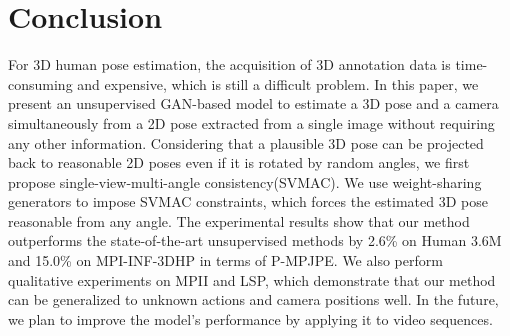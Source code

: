 \documentclass[10pt,twocolumn,letterpaper]{article}
\begin{document}
\section{Conclusion}
For 3D human pose estimation, the acquisition of 3D annotation data is time-consuming and expensive, which is still a difficult problem. 
In this paper, we present an unsupervised GAN-based model to estimate a 3D pose and a camera simultaneously from a 2D pose extracted from a single image without requiring any other information. 
Considering that a plausible 3D pose can be projected back to reasonable 2D poses even if it is rotated by random angles, we first propose single-view-multi-angle consistency(SVMAC).
We use weight-sharing generators to impose SVMAC constraints, which forces the estimated 3D pose reasonable from any angle. 
The experimental results show that our method outperforms the state-of-the-art unsupervised methods by 2.6\% on Human 3.6M and 15.0\% on MPI-INF-3DHP in terms of P-MPJPE. We also perform qualitative experiments on MPII and LSP, which demonstrate that our method can be generalized to unknown actions and camera positions well. In the future, we plan to improve the model's performance by applying it to video sequences.

{\small

   

}
\end{document}
